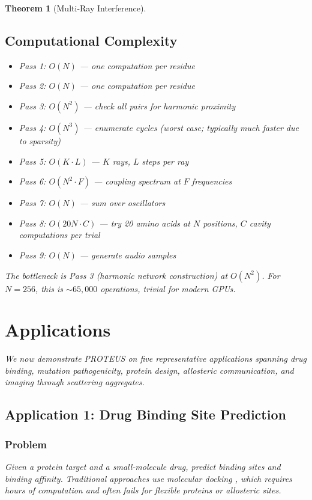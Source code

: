 \documentclass[11pt,a4paper]{article}
\newtheorem{theorem}{Theorem}[section]
\begin{document}
\begin{theorem}[Multi-Ray Interference]
\subsection{Computational Complexity}

\begin{itemize}
\item Pass 1: $O(N)$ — one computation per residue
\item Pass 2: $O(N)$ — one computation per residue
\item Pass 3: $O(N^2)$ — check all pairs for harmonic proximity
\item Pass 4: $O(N^3)$ — enumerate cycles (worst case; typically much faster due to sparsity)
\item Pass 5: $O(K \cdot L)$ — $K$ rays, $L$ steps per ray
\item Pass 6: $O(N^2 \cdot F)$ — coupling spectrum at $F$ frequencies
\item Pass 7: $O(N)$ — sum over oscillators
\item Pass 8: $O(20N \cdot C)$ — try 20 amino acids at $N$ positions, $C$ cavity computations per trial
\item Pass 9: $O(N)$ — generate audio samples
\end{itemize}

The bottleneck is Pass 3 (harmonic network construction) at $O(N^2)$. For $N = 256$, this is $\sim 65,000$ operations, trivial for modern GPUs.

\section{Applications}

We now demonstrate PROTEUS on five representative applications spanning drug binding, mutation pathogenicity, protein design, allosteric communication, and imaging through scattering aggregates.

\subsection{Application 1: Drug Binding Site Prediction}

\subsubsection{Problem}

Given a protein target and a small-molecule drug, predict binding sites and binding affinity. Traditional approaches use molecular docking \cite{Morris2009}, which requires hours of computation and often fails for flexible proteins or allosteric sites.


\end{theorem}
\end{document}
